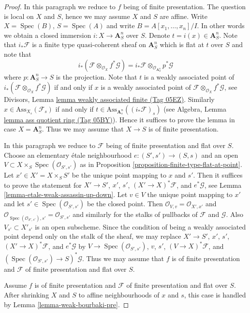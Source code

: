 \documentclass{amsart}
\theoremstyle{plain}
\theoremstyle{definition}
\theoremstyle{remark}
\numberwithin{equation}{subsection}
\def\Spec{\mathop{\mathrm{Spec}}}
\begin{document}
\begin{proof}
In this paragraph we reduce to $f$ being of finite presentation.
The question is local on $X$ and $S$, hence we may assume $X$ and $S$
are affine. Write $X = \Spec(B)$, $S = \Spec(A)$ and write
$B = A[x_1, \ldots, x_n]/I$. In other words we obtain a closed immersion
$i : X \to \mathbf{A}^n_S$ over $S$. Denote $t = i(x) \in \mathbf{A}^n_S$.
Note that $i_*\mathcal{F}$ is a finite type quasi-coherent sheaf on
$\mathbf{A}^n_S$ which is flat at $t$ over $S$ and note that
$$
i_*(\mathcal{F} \otimes_{\mathcal{O}_X} f^*\mathcal{G}) =
i_*\mathcal{F} \otimes_{\mathcal{O}_{\mathbf{A}^n_S}} p^*\mathcal{G}
$$
where $p : \mathbf{A}^n_S \to S$ is the projection. Note that
$t$ is a weakly associated point of
$i_*(\mathcal{F} \otimes_{\mathcal{O}_X} f^*\mathcal{G})$
if and only if $x$ is a weakly associated point of
$\mathcal{F} \otimes_{\mathcal{O}_X} f^*\mathcal{G}$, see
Divisors, Lemma \href{https://stacks.math.columbia.edu/tag/05EZ}{lemma weakly associated finite (Tag 05EZ)}.
Similarly $x \in \text{Ass}_{X_s}(\mathcal{F}_s)$ if and only
if $t \in \text{Ass}_{\mathbf{A}^n_s}((i_*\mathcal{F})_s)$ (see
Algebra, Lemma \href{https://stacks.math.columbia.edu/tag/05BY}{lemma ass quotient ring (Tag 05BY)}).
Hence it suffices to prove the lemma in case $X = \mathbf{A}^n_S$.
Thus we may assume that $X \to S$ is of finite presentation.

\medskip\noindent
In this paragraph we reduce to $\mathcal{F}$ being of finite presentation
and flat over $S$.
Choose an elementary \'etale neighbourhood $e : (S', s') \to (S, s)$
and an open $V \subset X \times_S \Spec(\mathcal{O}_{S', s'})$
as in Proposition \ref{proposition-finite-type-flat-at-point}.
Let $x' \in X' = X \times_S S'$ be the unique point mapping to $x$
and $s'$. Then it suffices to prove the statement for
$X' \to S'$, $x'$, $s'$, $(X' \to X)^*\mathcal{F}$, and $e^*\mathcal{G}$, see
Lemma \ref{lemma-etale-weak-assassin-up-down}.
Let $v \in V$ the unique point mapping to $x'$
and let $s' \in \Spec(\mathcal{O}_{S', s'})$ be the closed point.
Then $\mathcal{O}_{V, v} = \mathcal{O}_{X', x'}$
and $\mathcal{O}_{\Spec(\mathcal{O}_{S', s'}), s'} =
\mathcal{O}_{S', s'}$ and similarly for the stalks of pullbacks of
$\mathcal{F}$ and $\mathcal{G}$.
Also $V_{s'} \subset X'_{s'}$ is an open subscheme.
Since the condition of being a weakly associated point
depend only on the stalk of the sheaf, we may
replace
$X' \to S'$, $x'$, $s'$, $(X' \to X)^*\mathcal{F}$, and $e^*\mathcal{G}$
by
$V \to \Spec(\mathcal{O}_{S', s'})$, $v$, $s'$, $(V \to X)^*\mathcal{F}$,
and $(\Spec(\mathcal{O}_{S', s'}) \to S)^*\mathcal{G}$.
Thus we may assume that $f$ is of finite presentation and
$\mathcal{F}$ of finite presentation and flat over $S$.

\medskip\noindent
Assume $f$ is of finite presentation and
$\mathcal{F}$ of finite presentation and flat over $S$.
After shrinking $X$ and $S$ to affine neighbourhoods
of $x$ and $s$, this case is handled by
Lemma \ref{lemma-weak-bourbaki-pre}.
\end{proof}
\end{document}

